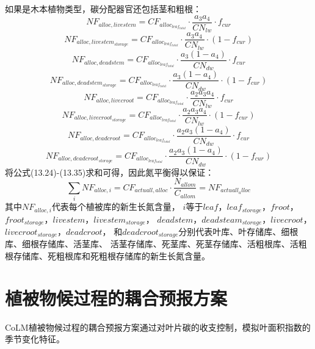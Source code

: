 如果是木本植物类型，碳分配器官还包括茎和粗根：
\begin{equation}
  NF_{alloc,livestem}=CF_{alloc_{leaf_{total}}}\cdot \frac{a_3a_4}{CN_{lw}}\cdot f_{cur}
\end{equation}
\begin{equation}
  NF_{alloc,livestem_{storage}}=CF_{alloc_{leaf_{total}}}\cdot \frac{a_3a_4}{CN_{lw}}\cdot \left(1-f_{cur}\right)
\end{equation}
\begin{equation}
  NF_{alloc,deadstem}=CF_{alloc_{leaf_{total}}}\cdot \frac{a_3\left(1-a_4\right)}{CN_{dw}}\cdot f_{cur}
\end{equation}
\begin{equation}
  NF_{alloc,deadstem_{storage}}=CF_{alloc_{leaf_{total}}}\cdot \frac{a_3\left(1-a_4\right)}{CN_{dw}}\cdot \left(1-f_{cur}\right)
\end{equation}
\begin{equation}
  NF_{alloc,livecroot}=CF_{alloc_{leaf_{total}}}\cdot \frac{a_2a_3a_4}{CN_{lw}}\cdot f_{cur}
\end{equation}
\begin{equation}
  NF_{alloc,livecroot_{storage}}=CF_{alloc_{leaf_{total}}}\cdot \frac{a_2a_3a_4}{CN_{lw}}\cdot \left(1-f_{cur}\right)
\end{equation}
\begin{equation}
  NF_{alloc,deadcroot}=CF_{alloc_{leaf_{total}}}\cdot \frac{a_2a_3\left(1-a_4\right)}{CN_{dw}}\cdot f_{cur}
\end{equation}
\begin{equation}
  NF_{alloc,deadcroot_{storage}}=CF_{alloc_{leaf_{total}}}\cdot \frac{a_2a_3\left(1-a_4\right)}{CN_{dw}}\cdot \left(1-f_{cur}\right)
\end{equation}
将公式(13.24)-(13.35)求和可得，因此氮平衡得以保证：
\begin{equation}
  \sum_{i}{NF_{alloc,i}}=CF_{actuall,alloc}\cdot \frac{N_{allom}}{C_{allom}}=NF_{actuall_alloc}
\end{equation}
其中$NF_{alloc,i}$代表每个植被库的新生长氮含量， 
$i$等于$leaf$，$leaf_{storage}$，$froot$，$froot_{storage}$，$livestem$，$livestem_{storage}$，
$deadstem$，$deadsteam_{storage}$，$livecroot$，$livecroot_{storage}$，$deadcroot$，
 和$deadcroot_{storage}$分别代表叶库、叶存储库、细根库、细根存储库、活茎库、
 活茎存储库、死茎库、死茎存储库、活粗根库、活粗根存储库、死粗根库和死粗根存储库的新生长氮含量。

\section{植被物候过程的耦合预报方案}\label{植被物候过程的耦合预报方案}
CoLM植被物候过程的耦合预报方案通过对叶片碳的收支控制，模拟叶面积指数的季节变化特征。
